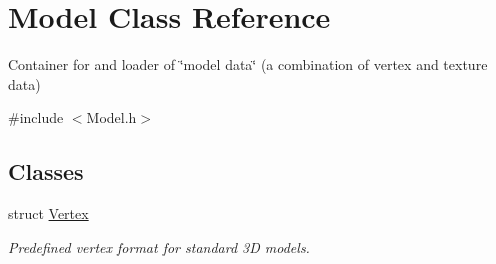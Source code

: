 \hypertarget{class_model}{}\section{Model Class Reference}
\label{class_model}


Container for and loader of \char`\"{}model data\char`\"{} (a combination of vertex and texture data)  




{\ttfamily \#include $<$Model.\+h$>$}

\subsection*{Classes}
\begin{DoxyCompactItemize}
\item 
struct \hyperlink{struct_model_1_1_vertex}{Vertex}
\begin{DoxyCompactList}\small\item\em Predefined vertex format for standard 3D models. \end{DoxyCompactList}\end{DoxyCompactItemize}
